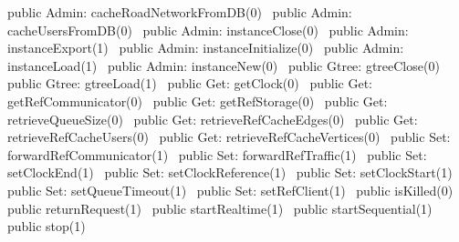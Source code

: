 public \LA{}Admin: cacheRoadNetworkFromDB(0)~{\nwtagstyle{}}\RA{}
public \LA{}Admin: cacheUsersFromDB(0)~{\nwtagstyle{}}\RA{}
public \LA{}Admin: instanceClose(0)~{\nwtagstyle{}}\RA{}
public \LA{}Admin: instanceExport(1)~{\nwtagstyle{}}\RA{}
public \LA{}Admin: instanceInitialize(0)~{\nwtagstyle{}}\RA{}
public \LA{}Admin: instanceLoad(1)~{\nwtagstyle{}}\RA{}
public \LA{}Admin: instanceNew(0)~{\nwtagstyle{}}\RA{}
public \LA{}Gtree: gtreeClose(0)~{\nwtagstyle{}}\RA{}
public \LA{}Gtree: gtreeLoad(1)~{\nwtagstyle{}}\RA{}
public \LA{}Get: getClock(0)~{\nwtagstyle{}}\RA{}
public \LA{}Get: getRefCommunicator(0)~{\nwtagstyle{}}\RA{}
public \LA{}Get: getRefStorage(0)~{\nwtagstyle{}}\RA{}
public \LA{}Get: retrieveQueueSize(0)~{\nwtagstyle{}}\RA{}
public \LA{}Get: retrieveRefCacheEdges(0)~{\nwtagstyle{}}\RA{}
public \LA{}Get: retrieveRefCacheUsers(0)~{\nwtagstyle{}}\RA{}
public \LA{}Get: retrieveRefCacheVertices(0)~{\nwtagstyle{}}\RA{}
public \LA{}Set: forwardRefCommunicator(1)~{\nwtagstyle{}}\RA{}
public \LA{}Set: forwardRefTraffic(1)~{\nwtagstyle{}}\RA{}
public \LA{}Set: setClockEnd(1)~{\nwtagstyle{}}\RA{}
public \LA{}Set: setClockReference(1)~{\nwtagstyle{}}\RA{}
public \LA{}Set: setClockStart(1)~{\nwtagstyle{}}\RA{}
public \LA{}Set: setQueueTimeout(1)~{\nwtagstyle{}}\RA{}
public \LA{}Set: setRefClient(1)~{\nwtagstyle{}}\RA{}
public \LA{}isKilled(0)~{\nwtagstyle{}}\RA{}
public \LA{}returnRequest(1)~{\nwtagstyle{}}\RA{}
public \LA{}startRealtime(1)~{\nwtagstyle{}}\RA{}
public \LA{}startSequential(1)~{\nwtagstyle{}}\RA{}
public \LA{}stop(1)~{\nwtagstyle{}}\RA{}
\nwendcode{}\nwdocspar

